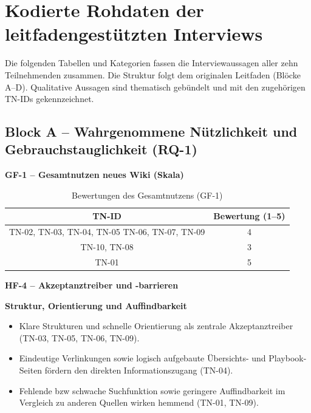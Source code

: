\section{Kodierte Rohdaten der leitfadengestützten Interviews}
\label{sec:BB-06_feedbackinterviews}

Die folgenden Tabellen und Kategorien fassen die Interviewaussagen aller zehn Teilnehmenden zusammen.
Die Struktur folgt dem originalen Leitfaden (Blöcke A--D).
Qualitative Aussagen sind thematisch gebündelt und mit den zugehörigen TN-IDs gekennzeichnet.

\vspace{2em}
\subsection{Block A -- Wahrgenommene Nützlichkeit und Gebrauchstauglichkeit (RQ-1)}

\textbf{GF-1 -- Gesamtnutzen neues Wiki (Skala)}

\begin{table}[H]
  \centering
  \caption{Bewertungen des Gesamtnutzens (GF-1)}
  \label{tab:BB-gf1}
  \begin{tabular}{c c}
    \toprule
    TN-ID                                          & Bewertung (1--5) \\
    \midrule
    TN-02, TN-03, TN-04, TN-05 TN-06, TN-07, TN-09 & 4                \\
    TN-10, TN-08                                   & 3                \\
    TN-01                                          & 5                \\
    \bottomrule
  \end{tabular}
\end{table}

\vspace{2em}
\textbf{HF-4 -- Akzeptanztreiber und -barrieren}

\textbf{Struktur, Orientierung und Auffindbarkeit}
\begin{itemize}
  \item Klare Strukturen und schnelle Orientierung als zentrale Akzeptanztreiber 
  (TN-03, TN-05, TN-06, TN-09).
  \item Eindeutige Verlinkungen sowie logisch aufgebaute Übersichts- und Playbook-Seiten fördern den direkten Informationszugang 
  (TN-04).
  \item Fehlende \acrshort{bzw} schwache Suchfunktion sowie geringere Auffindbarkeit im Vergleich zu anderen Quellen wirken hemmend 
  (TN-01, TN-09).
\end{itemize}

